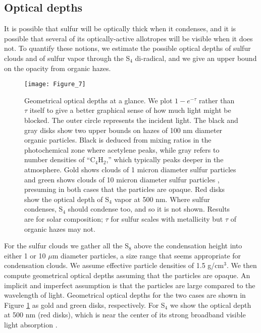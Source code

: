 \documentclass[preprint]{aastex}
\begin{document}
\subsection{Optical depths}

It is possible that sulfur will be optically thick when it condenses,
and it is possible that several of its optically-active allotropes will be visible when it does not.
{\color{red} To quantify these notions, we estimate the possible optical depths of sulfur clouds and of sulfur vapor through the S$_4$ di-radical,
and we give an upper bound on the opacity from organic hazes.}

  \begin{figure}[!htb] 
   \centering
   \texttt{[image: Figure\_7]} 
   \caption{\small {\color{red} Geometrical }optical depths at a glance. 
   We plot $1-e^{-\tau}$ rather than $\tau$ itself to give a better graphical
   sense of how much light {\color{red} might be} blocked.  The outer circle represents the incident light.
   The black and gray disks show two upper bounds on {\color{red} hazes} of 100 nm diameter organic particles.
   Black is deduced from mixing ratios in the photochemical
   zone where acetylene peaks, while gray refers to number densities of ``C$_4$H$_2$,'' which typically peaks deeper in the atmosphere. 
   Gold shows clouds of 1 micron diameter sulfur particles and green
   shows clouds of 10 micron diameter sulfur particles {\color{red}, presuming in both cases that the particles are opaque.}
   Red disks show the optical depth of S$_4$ vapor at 500 nm.
   Where sulfur condenses, S$_4$ should condense too, and so it is not shown.  
   Results are for solar composition; $\tau$ for sulfur scales with metallicity but $\tau$ of organic hazes may not.
    }
\label{optical depth}
\end{figure}

For the sulfur clouds we gather all the S$_8$ above the condensation height into either 1 or 10 $\mu$m diameter particles,
a size range that seems appropriate for condensation clouds.
We assume effective particle densities of 1.5 g/cm$^3$. 
{\color{red} We then compute geometrical optical depths assuming that the particles are opaque.
An implicit and imperfect assumption is that the particles are large compared to the wavelength of light.
Geometrical optical depths for the two cases are shown} in Figure \ref{optical depth} as gold and green disks, respectively.
For S$_4$ we show the optical depth at 500 nm (red disks), which is near the center of its strong broadband visible light absorption \citep{Meyer1976}.
\end{document}
